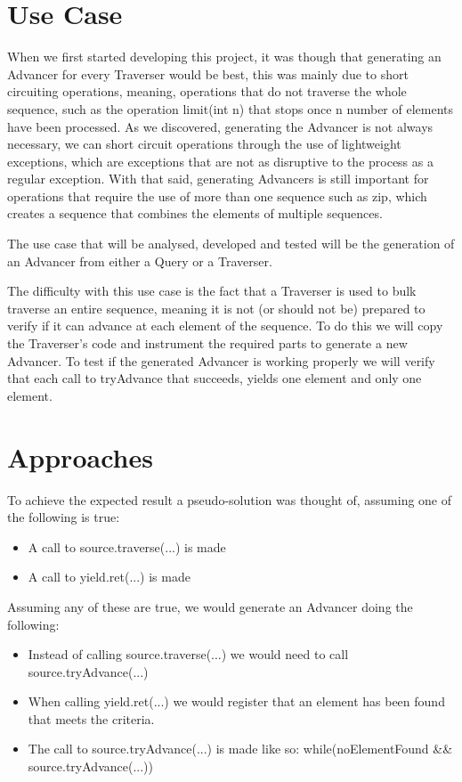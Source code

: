 \section{Use Case}

When we first started developing this project, it was though that generating an Advancer for every Traverser would be best, this was mainly due to short circuiting operations, meaning, operations that do not traverse the whole sequence, such as the operation limit(int n) that stops once n number of elements have been processed. As we discovered, generating the Advancer is not always necessary, we can short circuit operations through the use of lightweight exceptions, which are exceptions that are not as disruptive to the process as a regular exception. With that said, generating Advancers is still important for operations that require the use of more than one sequence such as zip, which creates a sequence that combines the elements of multiple sequences.

The use case that will be analysed, developed and tested will be the generation of an Advancer from either a Query or a Traverser.

The difficulty with this use case is the fact that a Traverser is used to bulk traverse an entire sequence, meaning it is not (or should not be) prepared to verify if it can advance at each element of the sequence. To do this we will copy the Traverser's code and instrument the required parts to generate a new Advancer. To test if the generated Advancer is working properly we will verify that each call to tryAdvance that succeeds, yields one element and only one element.

\section{Approaches}
To achieve the expected result a pseudo-solution was thought of, assuming one of the following is true:
\begin{itemize}
\item A call to source.traverse(...) is made
\item A call to yield.ret(...) is made
\end{itemize}


Assuming any of these are true, we would generate an Advancer doing the following:
\begin{itemize}
\item Instead of calling source.traverse(...) we would need to call source.tryAdvance(...)
\item When calling yield.ret(...) we would register that an element has been found that meets the criteria.
\item The call to source.tryAdvance(...) is made like so: while(noElementFound \&\& source.tryAdvance(...))
\end{itemize}

